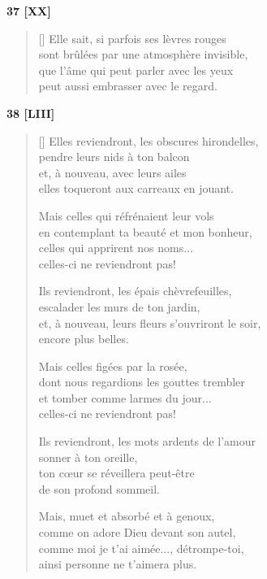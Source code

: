 \documentclass[a4paper,12pt]{book}
\begin{document}
\bigskip

\begin{center}
  \textbf{37 [XX]}
\end{center}

\settowidth{\versewidth}{sont brûlées par une atmosphère invisible,}

\begin{verse}[\versewidth]
  Elle sait, si parfois ses lèvres rouges \\
  sont brûlées par une atmosphère invisible, \\
  que l'âme qui peut parler avec les yeux \\
  peut aussi embrasser avec le regard.
\end{verse}

\bigskip

\begin{center}
  \textbf{38 [LIII]}
\end{center}

\settowidth{\versewidth}{et, à nouveau, leurs fleurs s'ouvriront le soir,}

\begin{verse}[\versewidth]
  Elles reviendront, les obscures hirondelles, \\
  pendre leurs nids à ton balcon \\
  et, à nouveau, avec leurs ailes \\
  elles toqueront aux carreaux en jouant.

  Mais celles qui réfrénaient leur vols \\
  en contemplant ta beauté et mon bonheur, \\
  celles qui apprirent nos noms... \\
  celles-ci ne reviendront pas!

  Ils reviendront, les épais chèvrefeuilles, \\
  escalader les murs de ton jardin, \\
  et, à nouveau, leurs fleurs s'ouvriront le soir, \\
  encore plus belles.

  Mais celles figées par la rosée, \\
  dont nous regardions les gouttes trembler \\
  et tomber comme larmes du jour... \\
  celles-ci ne reviendront pas!

  Ils reviendront, les mots ardents de l'amour \\
  sonner à ton oreille, \\
  ton cœur se réveillera peut-être \\
  de son profond sommeil.

  Mais, muet et absorbé et à genoux, \\
  comme on adore Dieu devant son autel, \\
  comme moi je t'ai aimée..., détrompe-toi, \\
  ainsi personne ne t'aimera plus.
\end{verse}
\end{document}
